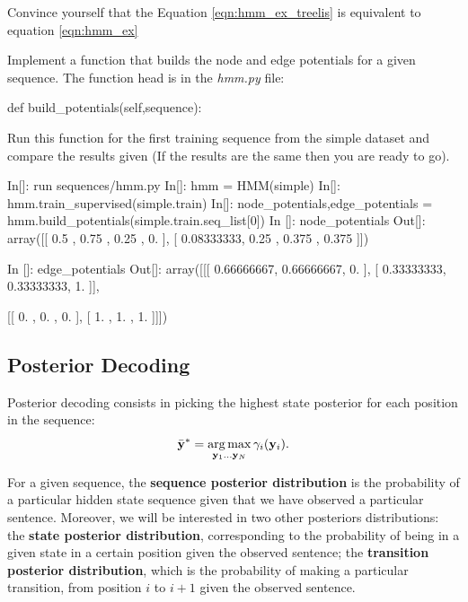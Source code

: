 \begin{exercise}
Convince yourself that the Equation \ref{eqn:hmm_ex_treelis} is equivalent to equation \ref{eqn:hmm_ex}

Implement a function that builds the node and edge potentials for a
given sequence. The function head is in the \emph{hmm.py} file:

\begin{python}
 def build_potentials(self,sequence):
\end{python}

Run this function for the first training sequence from the simple
dataset and compare the results given (If the results are the same
then you are ready to go).

\begin{python}
In[]:  run sequences/hmm.py
In[]: hmm = HMM(simple)
In[]: hmm.train_supervised(simple.train)
In[]: node_potentials,edge_potentials = hmm.build_potentials(simple.train.seq_list[0])
In []: node_potentials
Out[]: 
array([[ 0.5       ,  0.75      ,  0.25      ,  0.        ],
       [ 0.08333333,  0.25      ,  0.375     ,  0.375     ]])

In []: edge_potentials
Out[]: 
array([[[ 0.66666667,  0.66666667,  0.        ],
        [ 0.33333333,  0.33333333,  1.        ]],

       [[ 0.        ,  0.        ,  0.        ],
        [ 1.        ,  1.        ,  1.        ]]])

\end{python}
\end{exercise}



\subsection{Posterior Decoding}
Posterior decoding consists
in picking the highest state posterior for each position in the sequence:
\begin{equation}
\bar{\mathbf{y}}^* = \operatorname*{arg\,max}_{\mathbf{y}_1 \ldots \mathbf{y}_N} \gamma_i(\mathbf{y}_i).
\end{equation}

For a given sequence, the \textbf{sequence posterior distribution} is the probability of a particular
hidden state sequence given that we have observed a particular
sentence. Moreover, we will be interested in two other posteriors distributions:
the \textbf{state posterior distribution}, corresponding to the
probability of being in a given state in a certain position given the
observed sentence; the \textbf{transition posterior distribution},
which is the probability of making a particular transition, from position $i$ to
$i+1$ given the observed sentence. 

